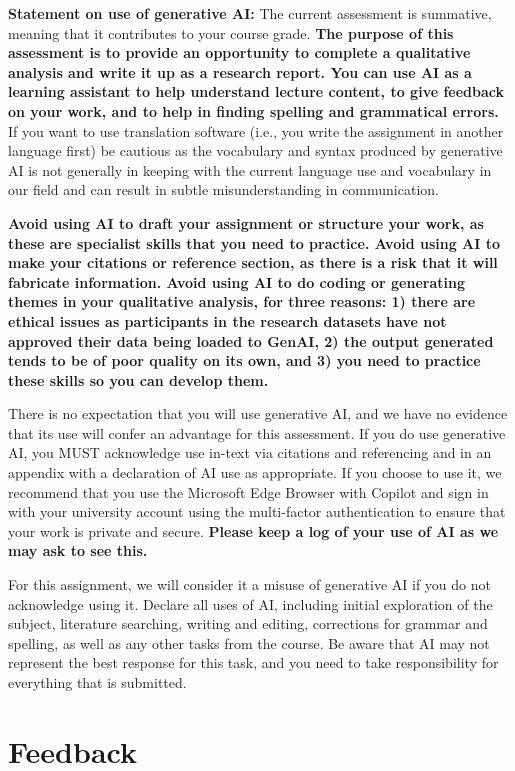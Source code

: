 \documentclass[
  english,
  letterpaper,
  DIV=11,
  numbers=noendperiod]{scrreprt}
\begin{document}
\textbf{Statement on use of generative AI:} The current assessment is
summative, meaning that it contributes to your course grade. \textbf{The
purpose of this assessment is to provide an opportunity to complete a
qualitative analysis and write it up as a research report. You can use
AI as a learning assistant to help understand lecture content, to give
feedback on your work, and to help in finding spelling and grammatical
errors.} If you want to use translation software (i.e., you write the
assignment in another language first) be cautious as the vocabulary and
syntax produced by generative AI is not generally in keeping with the
current language use and vocabulary in our field and can result in
subtle misunderstanding in communication.

\textbf{Avoid using AI to draft your assignment or structure your work,
as these are specialist skills that you need to practice. Avoid using AI
to make your citations or reference section, as there is a risk that it
will fabricate information. Avoid using AI to do coding or generating
themes in your qualitative analysis, for three reasons: 1) there are
ethical issues as participants in the research datasets have not
approved their data being loaded to GenAI, 2) the output generated tends
to be of poor quality on its own, and 3) you need to practice these
skills so you can develop them.}

There is no expectation that you will use generative AI, and we have no
evidence that its use will confer an advantage for this assessment. If
you do use generative AI, you MUST acknowledge use in-text via citations
and referencing and in an appendix with a declaration of AI use as
appropriate. If you choose to use it, we recommend that you use the
Microsoft Edge Browser with Copilot and sign in with your university
account using the multi-factor authentication to ensure that your work
is private and secure. \textbf{Please keep a log of your use of AI as we
may ask to see this.}

For this assignment, we will consider it a misuse of generative AI if
you do not acknowledge using it. Declare all uses of AI, including
initial exploration of the subject, literature searching, writing and
editing, corrections for grammar and spelling, as well as any other
tasks from the course. Be aware that AI may not represent the best
response for this task, and you need to take responsibility for
everything that is submitted.

\section{Feedback}\label{report_feedback}
\end{document}
